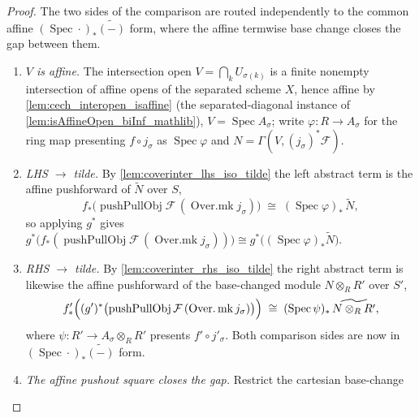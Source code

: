 \begin{proof}
  \leanok
  The two sides of the comparison are routed independently to the common affine
  \((\operatorname{Spec}\cdot)_*\widetilde{(-)}\) form, where the affine termwise base change
  closes the gap between them.
  \begin{enumerate}
    \item \emph{\(V\) is affine.} The intersection open
      \(V = \bigcap_k U_{\sigma(k)}\) is a finite nonempty intersection of affine opens of the
      separated scheme \(X\), hence affine by \cref{lem:cech_interopen_isaffine} (the
      separated-diagonal instance of \cref{lem:isAffineOpen_biInf_mathlib}),
      \(V = \operatorname{Spec} A_\sigma\); write \(\varphi : R \to A_\sigma\) for the ring map
      presenting \(f \circ j_\sigma\) as \(\operatorname{Spec}\varphi\) and
      \(N = \Gamma(V, (j_\sigma)^*\mathcal{F})\).
    \item \emph{LHS \(\to\) tilde.} By \cref{lem:coverinter_lhs_iso_tilde} the left abstract
      term is the affine pushforward of \(\widetilde{N}\) over \(S\),
      \[
        f_*\bigl(\operatorname{pushPullObj}\mathcal{F}\,(\operatorname{Over.mk} j_\sigma)\bigr)
          \;\cong\; (\operatorname{Spec}\varphi)_*\,\widetilde{N},
      \]
      so applying \(g^*\) gives
      \(g^*\bigl(f_*(\operatorname{pushPullObj}\mathcal{F}\,(\operatorname{Over.mk}
      j_\sigma))\bigr) \cong g^*\bigl((\operatorname{Spec}\varphi)_*\widetilde{N}\bigr)\).
    \item \emph{RHS \(\to\) tilde.} By \cref{lem:coverinter_rhs_iso_tilde} the right abstract
      term is likewise the affine pushforward of the base-changed module
      \(N \otimes_R R'\) over \(S'\),
      \[
        f'_*\Bigl((g')^*\bigl(\operatorname{pushPullObj}\mathcal{F}\,
          (\operatorname{Over.mk} j_\sigma)\bigr)\Bigr)
          \;\cong\; (\operatorname{Spec}\psi)_*\,\widetilde{N \otimes_R R'},
      \]
      where \(\psi : R' \to A_\sigma \otimes_R R'\) presents
      \(f' \circ j'_\sigma\). Both comparison sides are now in
      \((\operatorname{Spec}\cdot)_*\widetilde{(-)}\) form.
    \item \emph{The affine pushout square closes the gap.} Restrict the cartesian base-change

\end{enumerate}
\end{proof}
